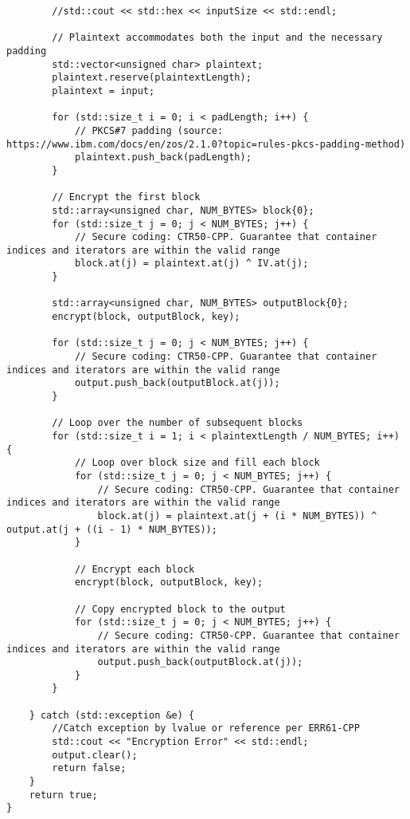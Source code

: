 \documentclass[a4paper,12pt]{article}
\begin{document}
{\begin{lstlisting}
        //std::cout << std::hex << inputSize << std::endl;

        // Plaintext accommodates both the input and the necessary padding
        std::vector<unsigned char> plaintext;
        plaintext.reserve(plaintextLength);
        plaintext = input;

        for (std::size_t i = 0; i < padLength; i++) {
            // PKCS#7 padding (source: https://www.ibm.com/docs/en/zos/2.1.0?topic=rules-pkcs-padding-method)
            plaintext.push_back(padLength);
        }

        // Encrypt the first block
        std::array<unsigned char, NUM_BYTES> block{0};
        for (std::size_t j = 0; j < NUM_BYTES; j++) {
            // Secure coding: CTR50-CPP. Guarantee that container indices and iterators are within the valid range
            block.at(j) = plaintext.at(j) ^ IV.at(j);
        }

        std::array<unsigned char, NUM_BYTES> outputBlock{0};
        encrypt(block, outputBlock, key);

        for (std::size_t j = 0; j < NUM_BYTES; j++) {
            // Secure coding: CTR50-CPP. Guarantee that container indices and iterators are within the valid range
            output.push_back(outputBlock.at(j));
        }

        // Loop over the number of subsequent blocks
        for (std::size_t i = 1; i < plaintextLength / NUM_BYTES; i++) {
            // Loop over block size and fill each block
            for (std::size_t j = 0; j < NUM_BYTES; j++) {
                // Secure coding: CTR50-CPP. Guarantee that container indices and iterators are within the valid range
                block.at(j) = plaintext.at(j + (i * NUM_BYTES)) ^ output.at(j + ((i - 1) * NUM_BYTES));
            }

            // Encrypt each block
            encrypt(block, outputBlock, key);

            // Copy encrypted block to the output
            for (std::size_t j = 0; j < NUM_BYTES; j++) {
                // Secure coding: CTR50-CPP. Guarantee that container indices and iterators are within the valid range
                output.push_back(outputBlock.at(j));
            }
        }

    } catch (std::exception &e) {
        //Catch exception by lvalue or reference per ERR61-CPP
        std::cout << "Encryption Error" << std::endl;
        output.clear();
        return false;
    }
    return true;
}



\end{lstlisting}}
\end{document}
